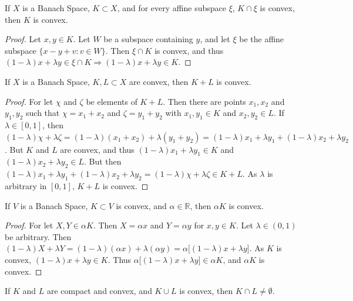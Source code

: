 \documentclass[crop=false,class=book,oneside]{standalone}
\begin{document}
            \begin{theorem}
            If $X$ is a Banach Space, $K\subset X$, and for every affine subspace $\xi$, $K\cap \xi$ is convex, then $K$ is convex.
            \end{theorem}
            \begin{proof}
            Let $x,y\in K$. Let $W$ be a subspace containing $y$, and let $\xi$ be the affine subspace $\{x-y+v:v\in W\}$. Then $\xi\cap K$ is convex, and thus $(1-\lambda)x+\lambda y \in \xi \cap K \Rightarrow (1-\lambda)x+\lambda y \in K$.
            \end{proof}
            \begin{theorem}
            If $X$ is a Banach Space, $K,L\subset X$ are convex, then $K+L$ is convex.
            \end{theorem}
            \begin{proof}
            For let $\chi$ and $\zeta$ be elements of $K+L$. Then there are points $x_1,x_2$ and $y_1,y_2$ such that $\chi=x_1+x_2$ and $\zeta = y_1+y_2$ with $x_1,y_1\in K$ and $x_2,y_2\in L$. If $\lambda \in [0,1]$, then $(1-\lambda)\chi + \lambda \zeta = (1-\lambda)(x_1+x_2)+\lambda(y_1+y_2) = (1-\lambda)x_1 + \lambda y_1 + (1-\lambda)x_2 + \lambda y_2$. But $K$ and $L$ are convex, and thus $(1-\lambda)x_1 + \lambda y_1 \in K$ and $(1-\lambda)x_2 + \lambda y_2 \in L$. But then $(1-\lambda)x_1 + \lambda y_1 + (1-\lambda)x_2 + \lambda y_2=(1-\lambda)\chi + \lambda \zeta\in K+L$. As $\lambda$ is arbitrary in $[0,1]$, $K+L$ is convex.
            \end{proof}
            \begin{theorem}
            If $V$ is a Banach Space, $K\subset V$ is convex, and $\alpha \in \mathbb{R}$, then $\alpha K$ is convex.
            \end{theorem}
            \begin{proof}
            For let $X,Y\in \alpha K$. Then $X = \alpha x$ and $Y = \alpha y$ for $x,y\in K$. Let $\lambda \in (0,1)$ be arbitrary. Then $(1-\lambda)X+\lambda Y =(1-\lambda)(\alpha x)+\lambda (\alpha y) = \alpha\big[(1-\lambda)x+\lambda y\big]$. As $K$ is convex, $(1-\lambda)x+\lambda y \in K$. Thus $\alpha\big[(1-\lambda)x+\lambda y\big] \in \alpha K$, and $\alpha K$ is convex.
            \end{proof}
            \begin{theorem}
            If $K$ and $L$ are compact and convex, and $K\cup L$ is convex, then $K\cap L \ne \emptyset$.
            \end{theorem}
\end{document}
